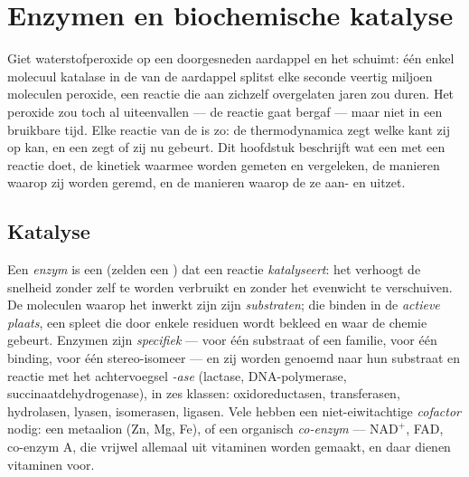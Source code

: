 \chapter{Enzymen en biochemische katalyse}\label{ch:b1:enzymes}

Giet waterstofperoxide op een doorgesneden aardappel en het schuimt: één enkel
molecuul katalase in de  van de aardappel splitst elke seconde veertig
miljoen moleculen peroxide, een reactie die aan zichzelf overgelaten jaren zou
duren. Het peroxide zou toch al uiteenvallen --- de reactie gaat bergaf --- maar
niet in een bruikbare tijd. Elke reactie van de  is zo: de thermodynamica zegt
welke kant zij op kan, en een \emph{} zegt of zij nu gebeurt. Dit hoofdstuk
beschrijft wat een  met een reactie doet, de kinetiek waarmee  worden
gemeten en vergeleken, de manieren waarop zij worden geremd, en de manieren
waarop de  ze aan- en uitzet.

\section{Katalyse}

\begin{definition}\label{def:b1:enzymes:enzyme}
Een \emph{enzym} is een  (zelden een ) dat een reactie
\emph{katalyseert}: het verhoogt de snelheid zonder zelf te worden verbruikt en
zonder het evenwicht te verschuiven. De moleculen waarop het inwerkt zijn zijn
\emph{substraten}; die binden in de \emph{actieve
plaats}, een spleet die door enkele residuen wordt bekleed
en waar de chemie gebeurt. Enzymen zijn \emph{specifiek} --- voor één substraat of
een familie, voor één binding, voor één stereo-isomeer --- en zij worden genoemd
naar hun substraat en reactie met het achtervoegsel \emph{-ase} (lactase,
DNA-polymerase, succinaatdehydrogenase), in zes klassen: oxidoreductasen,
transferasen, hydrolasen, lyasen, isomerasen, ligasen. Vele hebben een
niet-eiwitachtige \emph{cofactor} nodig: een metaalion (Zn, Mg,
Fe), of een organisch \emph{co-enzym} --- $\mathrm{NAD^+}$, FAD,
co-enzym A, die vrijwel allemaal uit vitaminen worden gemaakt, en daar dienen
vitaminen voor.
\end{definition}

